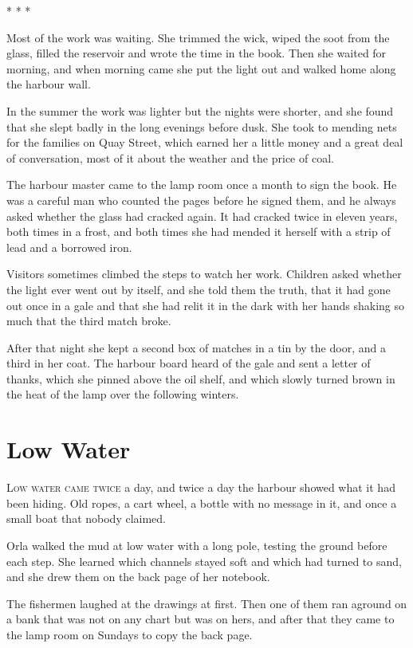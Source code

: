 \documentclass[11pt,twoside,openright]{book}
\begin{document}
\begin{center}* * *\end{center}

Most of the work was waiting. She trimmed the wick, wiped the soot from the glass, filled the reservoir and wrote the time in the book. Then she waited for morning, and when morning came she put the light out and walked home along the harbour wall.

In the summer the work was lighter but the nights were shorter, and she found that she slept badly in the long evenings before dusk. She took to mending nets for the families on Quay Street, which earned her a little money and a great deal of conversation, most of it about the weather and the price of coal.

The harbour master came to the lamp room once a month to sign the book. He was a careful man who counted the pages before he signed them, and he always asked whether the glass had cracked again. It had cracked twice in eleven years, both times in a frost, and both times she had mended it herself with a strip of lead and a borrowed iron.

Visitors sometimes climbed the steps to watch her work. Children asked whether the light ever went out by itself, and she told them the truth, that it had gone out once in a gale and that she had relit it in the dark with her hands shaking so much that the third match broke.

After that night she kept a second box of matches in a tin by the door, and a third in her coat. The harbour board heard of the gale and sent a letter of thanks, which she pinned above the oil shelf, and which slowly turned brown in the heat of the lamp over the following winters.

\chapter{Low Water}\label{c2}

\lettrine{L}{ow} \textsc{water came twice} a day, and twice a day the harbour showed what it had been hiding. Old ropes, a cart wheel, a bottle with no message in it, and once a small boat that nobody claimed.

Orla walked the mud at low water with a long pole, testing the ground before each step. She learned which channels stayed soft and which had turned to sand, and she drew them on the back page of her notebook.

The fishermen laughed at the drawings at first. Then one of them ran aground on a bank that was not on any chart but was on hers, and after that they came to the lamp room on Sundays to copy the back page.
\end{document}
